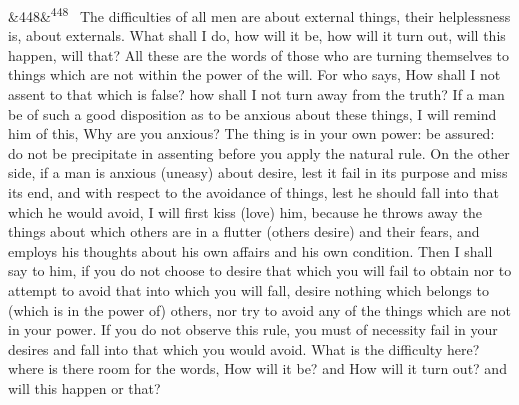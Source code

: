 \documentclass[12pt]{article}
\newcommand{\para}[1][]{\par\noindent\ifx&#1&\else\textsuperscript{\footnotesize #1}~\fi}
\begin{document}
\para[448] The difficulties of all men are about external things, their helplessness is, about externals. What shall I do, how will it be, how will it turn out, will this happen, will that? All these are the words of those who are turning themselves to things which are not within the power of the will. For who says, How shall I not assent to that which is false? how shall I not turn away from the truth? If a man be of such a good disposition as to be anxious about these things, I will remind him of this, Why are you anxious? The thing is in your own power: be assured: do not be precipitate in assenting before you apply the natural rule. On the other side, if a man is anxious (uneasy) about desire, lest it fail in its purpose and miss its end, and with respect to the avoidance of things, lest he should fall into that which he would avoid, I will first kiss (love) him, because he throws away the things about which others are in a flutter (others desire) and their fears, and employs his thoughts about his own affairs and his own condition. Then I shall say to him, if you do not choose to desire that which you will fail to obtain nor to attempt to avoid that into which you will fall, desire nothing which belongs to (which is in the power of) others, nor try to avoid any of the things which are not in your power. If you do not observe this rule, you must of necessity fail in your desires and fall into that which you would avoid. What is the difficulty here? where is there room for the words, How will it be? and How will it turn out? and will this happen or that?
\end{document}
